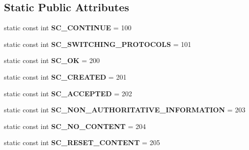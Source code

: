 \subsection*{Static Public Attributes}
\begin{DoxyCompactItemize}
\item 
\mbox{\label{class_http_servlet_response_a84380b3dab40453834a6ed5b2a779ae3}} 
static const int {\bfseries S\+C\+\_\+\+C\+O\+N\+T\+I\+N\+UE} = 100
\item 
\mbox{\label{class_http_servlet_response_a4851e3811e6263c5d60d617c15c1e245}} 
static const int {\bfseries S\+C\+\_\+\+S\+W\+I\+T\+C\+H\+I\+N\+G\+\_\+\+P\+R\+O\+T\+O\+C\+O\+LS} = 101
\item 
\mbox{\label{class_http_servlet_response_a7a1fdf58027ff5bafd8b7df7f1d2cb76}} 
static const int {\bfseries S\+C\+\_\+\+OK} = 200
\item 
\mbox{\label{class_http_servlet_response_a0bf1ae1f639fe1100e0bb01e2040ecb3}} 
static const int {\bfseries S\+C\+\_\+\+C\+R\+E\+A\+T\+ED} = 201
\item 
\mbox{\label{class_http_servlet_response_ae9bcf5c1c8e7d2534ac8f923238f2dcc}} 
static const int {\bfseries S\+C\+\_\+\+A\+C\+C\+E\+P\+T\+ED} = 202
\item 
\mbox{\label{class_http_servlet_response_a5fc885352ec49e23e39e54f4f5db6a46}} 
static const int {\bfseries S\+C\+\_\+\+N\+O\+N\+\_\+\+A\+U\+T\+H\+O\+R\+I\+T\+A\+T\+I\+V\+E\+\_\+\+I\+N\+F\+O\+R\+M\+A\+T\+I\+ON} = 203
\item 
\mbox{\label{class_http_servlet_response_add66436f385022cd20a67f6e658ff3ab}} 
static const int {\bfseries S\+C\+\_\+\+N\+O\+\_\+\+C\+O\+N\+T\+E\+NT} = 204
\item 
\mbox{\label{class_http_servlet_response_a90e315b315e862855075239a340b05b9}} 
static const int {\bfseries S\+C\+\_\+\+R\+E\+S\+E\+T\+\_\+\+C\+O\+N\+T\+E\+NT} = 205
\item 
\mbox{\label{class_http_servlet_response_af484a6665ff90049555cdd628420b89e}} 

\end{DoxyCompactItemize}

